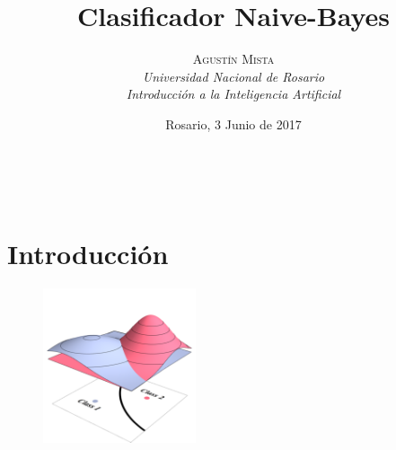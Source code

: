 \documentclass[a4paper, 11pt]{article} %
\title{\textbf{Clasificador Naive-Bayes}}
\author{
	\textsc{Agustín Mista}\\
	\textit{Universidad Nacional de Rosario}\\
 	\textit{Introducción a la Inteligencia Artificial}
}
\date{Rosario, 3 Junio de 2017}
\makeatletter
\renewcommand{\maketitle}{ %
\begin{flushright} %
{\LARGE\@title} %

\vspace{50pt} %

{\large\@author} %
\\\@date %

\vspace{40pt} %
\end{flushright}
}
\makeatother
\begin{document}
\maketitle %




\vspace{20pt} %


\section*{Introducción}

\begin{figure}
	\begin{center}
		\vspace{-20pt}
		\includegraphics[width=0.4\textwidth]{bayes.png}
		\vspace{-20pt}
	\end{center}
\end{figure}
\end{document}
